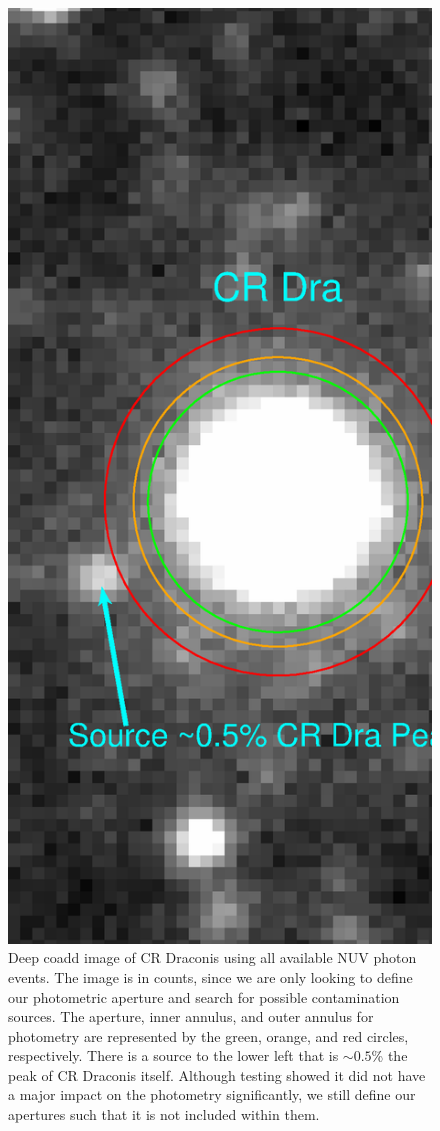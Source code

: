 \documentclass[5p]{elsarticle}
\begin{document}
\begin{figure}
\includegraphics[scale=0.375]{FigCRDraCoadd.eps}
\caption{Deep coadd image of CR Draconis using all available NUV photon events.  The image is in counts, since we are only looking to define our photometric aperture and search for possible contamination sources.  The aperture, inner annulus, and outer annulus for photometry are represented by the green, orange, and red circles, respectively.  There is a source to the lower left that is $\sim 0.5$\% the peak of CR Draconis itself.  Although testing showed it did not have a major impact on the photometry significantly, we still define our apertures such that it is not included within them.\label{crdracoadd}}
\end{figure}
\end{document}
